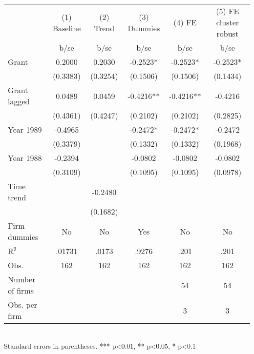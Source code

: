 \begin{tabular}{lccccc}\hline
                    &(1) Baseline   &   (2) Trend   & (3) Dummies   &      (4) FE   &(5) FE cluster robust   \\
                    &        b/se   &        b/se   &        b/se   &        b/se   &        b/se   \\
\hline
Grant               &      0.2000   &      0.2030   &     -0.2523*  &     -0.2523*  &     -0.2523*  \\
                    &    (0.3383)   &    (0.3254)   &    (0.1506)   &    (0.1506)   &    (0.1434)   \\
Grant lagged        &      0.0489   &      0.0459   &     -0.4216** &     -0.4216** &     -0.4216   \\
                    &    (0.4361)   &    (0.4247)   &    (0.2102)   &    (0.2102)   &    (0.2825)   \\
Year 1989           &     -0.4965   &               &     -0.2472*  &     -0.2472*  &     -0.2472   \\
                    &    (0.3379)   &               &    (0.1332)   &    (0.1332)   &    (0.1968)   \\
Year 1988           &     -0.2394   &               &     -0.0802   &     -0.0802   &     -0.0802   \\
                    &    (0.3109)   &               &    (0.1095)   &    (0.1095)   &    (0.0978)   \\
Time trend          &               &     -0.2480   &               &               &               \\
                    &               &    (0.1682)   &               &               &               \\
Firm dummies        &          No   &          No   &         Yes   &          No   &          No   \\
\hline
R$^2$               &      .01731   &       .0173   &       .9276   &        .201   &        .201   \\
Obs.                &         162   &         162   &         162   &         162   &         162   \\
Number of firms     &               &               &               &          54   &          54   \\
Obs. per firm       &               &               &               &           3   &           3   \\
\hline\end{tabular}\\Standard errors in parentheses. *** p<0.01, ** p<0.05, * p<0.1
